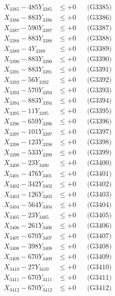 \documentclass[a4paper,10pt]{article}
\begin{document}
{\begin{align}
X_{3385} - 485Y_{3385} &\leq +0 && \text{(G3385)} \\
X_{3386} - 883Y_{3386} &\leq +0 && \text{(G3386)} \\
X_{3387} - 590Y_{3387} &\leq +0 && \text{(G3387)} \\
X_{3388} - 883Y_{3388} &\leq +0 && \text{(G3388)} \\
X_{3389} - 4Y_{3389} &\leq +0 && \text{(G3389)} \\
X_{3390} - 883Y_{3390} &\leq +0 && \text{(G3390)} \\
\allowbreak
X_{3391} - 883Y_{3391} &\leq +0 && \text{(G3391)} \\
X_{3392} - 56Y_{3392} &\leq +0 && \text{(G3392)} \\
X_{3393} - 570Y_{3393} &\leq +0 && \text{(G3393)} \\
X_{3394} - 883Y_{3394} &\leq +0 && \text{(G3394)} \\
X_{3395} - 11Y_{3395} &\leq +0 && \text{(G3395)} \\
X_{3396} - 659Y_{3396} &\leq +0 && \text{(G3396)} \\
X_{3397} - 101Y_{3397} &\leq +0 && \text{(G3397)} \\
X_{3398} - 123Y_{3398} &\leq +0 && \text{(G3398)} \\
X_{3399} - 533Y_{3399} &\leq +0 && \text{(G3399)} \\
X_{3400} - 23Y_{3400} &\leq +0 && \text{(G3400)} \\
\allowbreak
X_{3401} - 476Y_{3401} &\leq +0 && \text{(G3401)} \\
X_{3402} - 342Y_{3402} &\leq +0 && \text{(G3402)} \\
X_{3403} - 126Y_{3403} &\leq +0 && \text{(G3403)} \\
X_{3404} - 564Y_{3404} &\leq +0 && \text{(G3404)} \\
X_{3405} - 23Y_{3405} &\leq +0 && \text{(G3405)} \\
X_{3406} - 261Y_{3406} &\leq +0 && \text{(G3406)} \\
X_{3407} - 670Y_{3407} &\leq +0 && \text{(G3407)} \\
X_{3408} - 398Y_{3408} &\leq +0 && \text{(G3408)} \\
X_{3409} - 670Y_{3409} &\leq +0 && \text{(G3409)} \\
X_{3410} - 27Y_{3410} &\leq +0 && \text{(G3410)} \\
\allowbreak
X_{3411} - 670Y_{3411} &\leq +0 && \text{(G3411)} \\
X_{3412} - 670Y_{3412} &\leq +0 && \text{(G3412)} \\

\end{align}}
\end{document}
